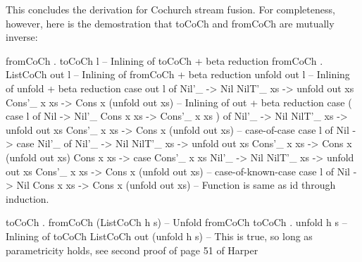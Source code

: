 This concludes the derivation for Cochurch stream fusion.
For completeness, however, here is the demostration that toCoCh and fromCoCh are mutually inverse:
\begin{spec}
fromCoCh . toCoCh l
-- Inlining of toCoCh + beta reduction
fromCoCh . ListCoCh out l
-- Inlining of fromCoCh + beta reduction
unfold out l
-- Inlining of unfold + beta reduction
case out l of
  Nil'_ -> Nil
  NilT'_ xs -> unfold out xs
  Cons'_ x xs -> Cons x (unfold out xs)
-- Inlining of out + beta reduction
case (
  case l of
    Nil -> Nil'_
    Cons x xs -> Cons'_ x xs
  ) of
  Nil'_ -> Nil
  NilT'_ xs -> unfold out xs
  Cons'_ x xs -> Cons x (unfold out xs)
-- case-of-case
case l of
  Nil -> case Nil'_ of
    Nil'_ -> Nil
    NilT'_ xs -> unfold out xs
    Cons'_ x xs -> Cons x (unfold out xs)
  Cons x xs -> case Cons'_ x xs
    Nil'_ -> Nil
    NilT'_ xs -> unfold out xs
    Cons'_ x xs -> Cons x (unfold out xs)
-- case-of-known-case
case l of
  Nil -> Nil
  Cons x xs -> Cons x (unfold out xs)
-- Function is same as id through induction.


toCoCh . fromCoCh (ListCoCh h s)
-- Unfold fromCoCh
toCoCh . unfold h s
-- Inlining of toCoCh
ListCoCh out (unfold h s)
-- This is true, so long as parametricity holds, see second proof of page 51 of Harper
\end{spec}
